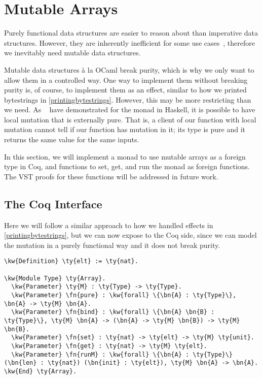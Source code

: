 \section{Mutable Arrays}
\label{mutablearrays}

Purely functional data structures are easier to reason about than imperative data structures. However, they are inherently inefficient for some use cases~\cite{ponder1988applicative, amram1992pointers, pippenger96pure, okasaki1999purely}, therefore we inevitably need mutable data structures.

Mutable data structures à la OCaml break purity, which is why we only want to allow them in a controlled way. One way to implement them without breaking purity is, of course, to implement them as an effect, similar to how we printed bytestrings in \autoref{printingbytestrings}. However, this may be more restricting than we need. As \citeauthor{launcybury1994lazy}~\cite{launcybury1994lazy} have demonstrated for the  monad in Haskell, it is possible to have local mutation that is externally pure. That is, a client of our function with local mutation cannot tell if our function has mutation in it; its type is pure and it returns the same value for the same inputs.

In this section, we will implement a monad to use mutable arrays as a \gls{foreign type} in Coq, and functions to set, get, and run the monad as \gls{foreign function}s. The VST proofs for these functions will be addressed in future work.

\subsection{The Coq Interface}

Here we will follow a similar approach to how we handled effects in \autoref{printingbytestrings}, but we can now expose  to the Coq side, since we can model the mutation in a purely functional way and it does not break purity.

\begin{Verbatim}
\kw{Definition} \ty{elt} := \ty{nat}.

\kw{Module Type} \ty{Array}.
  \kw{Parameter} \ty{M} : \ty{Type} -> \ty{Type}.
  \kw{Parameter} \fn{pure} : \kw{forall} \{\bn{A} : \ty{Type}\}, \bn{A} -> \ty{M} \bn{A}.
  \kw{Parameter} \fn{bind} : \kw{forall} \{\bn{A} \bn{B} : \ty{Type}\}, \ty{M} \bn{A} -> (\bn{A} -> \ty{M} \bn{B}) -> \ty{M} \bn{B}.
  \kw{Parameter} \fn{set} : \ty{nat} -> \ty{elt} -> \ty{M} \ty{unit}.
  \kw{Parameter} \fn{get} : \ty{nat} -> \ty{M} \ty{elt}.
  \kw{Parameter} \fn{runM} : \kw{forall} \{\bn{A} : \ty{Type}\} (\bn{len} : \ty{nat}) (\bn{init} : \ty{elt}), \ty{M} \bn{A} -> \bn{A}.
\kw{End} \ty{Array}.
\end{Verbatim}

